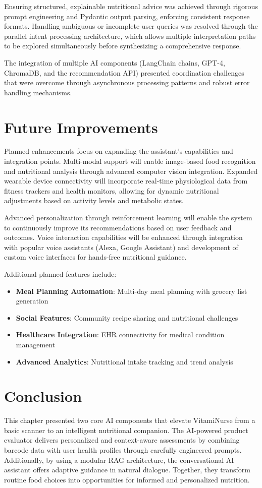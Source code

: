 Ensuring structured, explainable nutritional advice was achieved through rigorous prompt engineering and Pydantic output parsing, enforcing consistent response formats. Handling ambiguous or incomplete user queries was resolved through the parallel intent processing architecture, which allows multiple interpretation paths to be explored simultaneously before synthesizing a comprehensive response.

The integration of multiple AI components (LangChain chains, GPT-4, ChromaDB, and the recommendation API) presented coordination challenges that were overcome through asynchronous processing patterns and robust error handling mechanisms.

\section{Future Improvements}
Planned enhancements focus on expanding the assistant's capabilities and integration points. Multi-modal support will enable image-based food recognition and nutritional analysis through advanced computer vision integration. Expanded wearable device connectivity will incorporate real-time physiological data from fitness trackers and health monitors, allowing for dynamic nutritional adjustments based on activity levels and metabolic states.

Advanced personalization through reinforcement learning will enable the system to continuously improve its recommendations based on user feedback and outcomes. Voice interaction capabilities will be enhanced through integration with popular voice assistants (Alexa, Google Assistant) and development of custom voice interfaces for hands-free nutritional guidance.

Additional planned features include:
\begin{itemize}
\item \textbf{Meal Planning Automation}: Multi-day meal planning with grocery list generation
\item \textbf{Social Features}: Community recipe sharing and nutritional challenges
\item \textbf{Healthcare Integration}: EHR connectivity for medical condition management
\item \textbf{Advanced Analytics}: Nutritional intake tracking and trend analysis
\end{itemize}


\section{Conclusion}
This chapter presented two core AI components that elevate VitamiNurse from a basic scanner to an intelligent nutritional companion. 
The AI-powered product evaluator delivers personalized and context-aware assessments by combining barcode data with user health profiles through carefully engineered prompts. 
Additionally, by using a modular RAG architecture, the conversational AI assistant offers adaptive guidance in natural dialogue. 
Together, they transform routine food choices into opportunities for informed and personalized nutrition.


